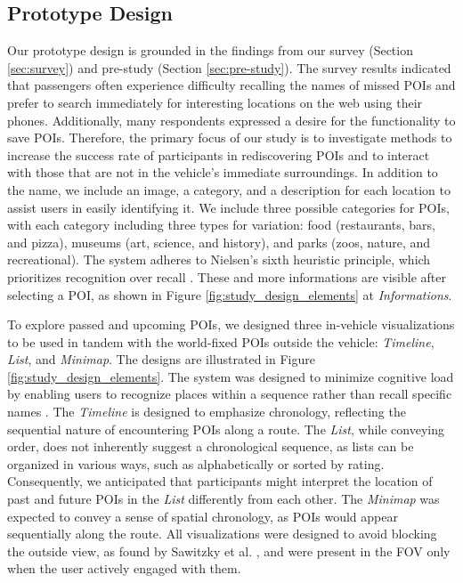\subsection{Prototype Design}
\label{sec:study_prototype_design}
Our prototype design is grounded in the findings from our survey (Section \ref{sec:survey}) and pre-study (Section \ref{sec:pre-study}). The survey results indicated that passengers often experience difficulty recalling the names of missed POIs and prefer to search immediately for interesting locations on the web using their phones. Additionally, many respondents expressed a desire for the functionality to save POIs. Therefore, the primary focus of our study is to investigate methods to increase the success rate of participants in rediscovering POIs and to interact with those that are not in the vehicle's immediate surroundings. In addition to the name, we include an image, a category, and a description for each location to assist users in easily identifying it. We include three possible categories for POIs, with each category including three types for variation: food (restaurants, bars, and pizza), museums (art, science, and history), and parks (zoos, nature, and recreational). The system adheres to Nielsen's sixth heuristic principle, which prioritizes recognition over recall \cite{Nielsen1994Usability}. These and more informations are visible after selecting a POI, as shown in Figure \ref{fig:study_design_elements} at \textit{Informations}.

To explore passed and upcoming POIs, we designed three in-vehicle visualizations to be used in tandem with the world-fixed POIs outside the vehicle: \textit{Timeline}, \textit{List}, and \textit{Minimap}. The designs are illustrated in Figure \ref{fig:study_design_elements}. The system was designed to minimize cognitive load by enabling users to recognize places within a sequence rather than recall specific names \cite{Nielsen1994Usability}. The \textit{Timeline} is designed to emphasize chronology, reflecting the sequential nature of encountering POIs along a route. The \textit{List}, while conveying order, does not inherently suggest a chronological sequence, as lists can be organized in various ways, such as alphabetically or sorted by rating. Consequently, we anticipated that participants might interpret the location of past and future POIs in the \textit{List} differently from each other. The \textit{Minimap} was expected to convey a sense of spatial chronology, as POIs would appear sequentially along the route. All visualizations were designed to avoid blocking the outside view, as found by Sawitzky et al. \cite{Sawitzky23ArPlacement}, and were present in the FOV only when the user actively engaged with them.

